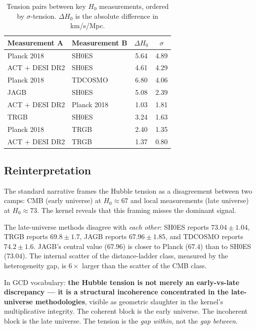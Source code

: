 \documentclass[
  aps,
  prd,
  twocolumn,
  superscriptaddress,
  nofootinbib,
  floatfix
]{revtex4-2}
\begin{document}
\begin{table}[h]
\caption{\label{tab:tensions}Tension pairs between key $H_0$
measurements, ordered by $\sigma$-tension. $\Delta H_0$ is the
absolute difference in km/s/Mpc.}
\begin{ruledtabular}
\begin{tabular}{llcc}
Measurement A & Measurement B & $\Delta H_0$ & $\sigma$ \\
\hline
Planck 2018 & SH0ES & 5.64 & 4.89 \\
ACT + DESI DR2 & SH0ES & 4.61 & 4.29 \\
Planck 2018 & TDCOSMO & 6.80 & 4.06 \\
JAGB & SH0ES & 5.08 & 2.39 \\
ACT + DESI DR2 & Planck 2018 & 1.03 & 1.81 \\
TRGB & SH0ES & 3.24 & 1.63 \\
Planck 2018 & TRGB & 2.40 & 1.35 \\
ACT + DESI DR2 & TRGB & 1.37 & 0.80 \\
\end{tabular}
\end{ruledtabular}
\end{table}

\subsection{Reinterpretation}

The standard narrative frames the Hubble tension as a disagreement
between two camps: CMB (early universe) at $H_0 \approx 67$ and
local measurements (late universe) at $H_0 \approx 73$.
The kernel reveals that this framing misses the dominant signal.

The late-universe methods disagree with \emph{each other}:
SH0ES reports $73.04 \pm 1.04$, TRGB reports $69.8 \pm 1.7$,
JAGB reports $67.96 \pm 1.85$, and TDCOSMO reports
$74.2 \pm 1.6$.
JAGB's central value ($67.96$) is closer to Planck ($67.4$)
than to SH0ES ($73.04$).
The internal scatter of the distance-ladder class, measured
by the heterogeneity gap, is $6\times$ larger than the
scatter of the CMB class.

In GCD vocabulary: \textbf{the Hubble tension is not merely
an early-vs-late discrepancy --- it is a structural incoherence
concentrated in the late-universe methodologies}, visible as
geometric slaughter in the kernel's multiplicative integrity.
The coherent block is the early universe.
The incoherent block is the late universe.
The tension is the \emph{gap within}, not the \emph{gap between}.
\end{document}
